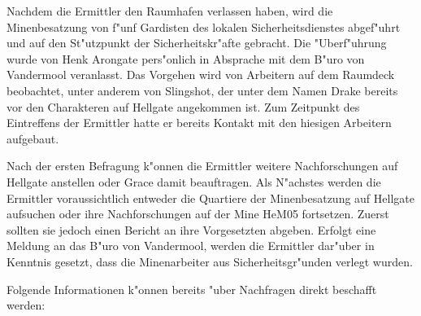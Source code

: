 Nachdem die Ermittler den Raumhafen verlassen haben, wird die Minenbesatzung von f"unf Gardisten des lokalen Sicherheitsdienstes abgef"uhrt und auf den St"utzpunkt der Sicherheitskr"afte gebracht. Die "Uberf"uhrung wurde von Henk Arongate pers"onlich in Absprache mit dem B"uro von Vandermool veranlasst. Das Vorgehen wird von Arbeitern auf dem Raumdeck beobachtet, unter anderem von Slingshot, der unter dem Namen Drake bereits vor den Charakteren auf Hellgate angekommen ist. Zum Zeitpunkt des Eintreffens der Ermittler hatte er bereits Kontakt mit den hiesigen Arbeitern aufgebaut.

Nach der ersten Befragung k"onnen die Ermittler weitere Nachforschungen auf Hellgate anstellen oder Grace damit beauftragen. Als N"achstes werden die Ermittler voraussichtlich entweder die Quartiere der Minenbesatzung auf Hellgate aufsuchen oder ihre Nachforschungen auf der Mine HeM05 fortsetzen. Zuerst sollten sie jedoch einen Bericht an ihre Vorgesetzten abgeben. Erfolgt eine Meldung an das B"uro von Vandermool, werden die Ermittler dar"uber in Kenntnis gesetzt, dass die Minenarbeiter aus Sicherheitsgr"unden verlegt wurden.

Folgende Informationen k"onnen bereits "uber Nachfragen direkt beschafft werden:

